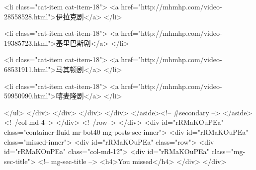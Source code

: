                             <li class="cat-item cat-item-18">
                                <a href="http://mhmhp.com/video-28558528.html">伊拉克剧</a>
                            </li>
                            
                            <li class="cat-item cat-item-18">
                                <a href="http://mhmhp.com/video-19385723.html">基里巴斯剧</a>
                            </li>
                            
                            <li class="cat-item cat-item-18">
                                <a href="http://mhmhp.com/video-68531911.html">马其顿剧</a>
                            </li>
                            
                            <li class="cat-item cat-item-18">
                                <a href="http://mhmhp.com/video-59950990.html">喀麦隆剧</a>
                            </li>
                            
                        </ul>
                    </div>
                </div>
            </div>
        </div>
    </aside><!-- #secondary -->
</aside>
                    <!--/col-md-4-->
                </div>
                <!--/row-->
            </div>
            <div id="rRMaKOuPEa"  class="container-fluid mr-bot40 mg-posts-sec-inner">
                <div id="rRMaKOuPEa"  class="missed-inner">
                    <div id="rRMaKOuPEa"  class="row">
                        <div id="rRMaKOuPEa"  class="col-md-12">
                            <div id="rRMaKOuPEa"  class="mg-sec-title">
                                <!-- mg-sec-title -->
                                <h4>You missed</h4>
                            </div>
                        </div>
                        
